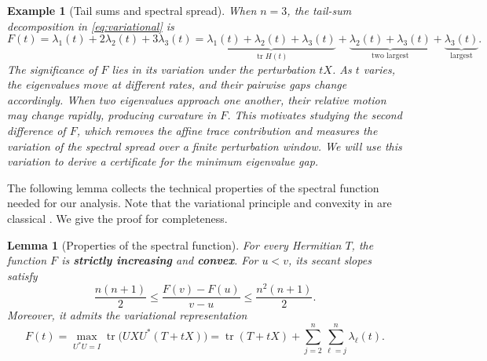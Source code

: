 \documentclass[10pt,a4paper]{article}
\newtheorem{lemma}{Lemma}[section]
\newtheorem{example}{Example}[section]
\DeclareMathOperator{\tr}{tr}
\begin{document}
\begin{example}[Tail sums and spectral spread]\label{ex:tails}
When $n=3$, the tail-sum decomposition in \eqref{eq:variational} is
\[
F(t)=\lambda_1(t)+2\lambda_2(t)+3\lambda_3(t)
=\underbrace{\lambda_1(t)+\lambda_2(t)+\lambda_3(t)}_{\tr H(t)}
+\underbrace{\lambda_2(t)+\lambda_3(t)}_{\text{two largest}}
+\underbrace{\lambda_3(t)}_{\text{largest}}.
\]
The significance of $F$ lies in its variation under the perturbation $tX$.
As $t$ varies, the eigenvalues move at different rates,
and their pairwise gaps change accordingly. When two
eigenvalues approach one another, their relative motion
may change rapidly, producing curvature in $F$.
This motivates studying the second difference of $F$,
which removes the affine trace contribution and measures
the variation of the spectral spread over a finite
perturbation window. We will use this variation to
derive a certificate for the minimum eigenvalue gap.
\end{example}

The following lemma collects the technical properties of the spectral function needed for our analysis. Note that the variational principle and convexity in  are classical
\cite{Fan1949,OvertonWomersley1992,Lewis1996Convex}. We give the proof for completeness. 

\begin{lemma}[Properties of the spectral function]\label{lem:convex}
For every Hermitian $T$, the function $F$ is
\textbf{strictly increasing} and \textbf{convex}.
For $u<v$, its secant slopes satisfy
\begin{equation}\label{eq:slopes}
\boxed{
\frac{n(n+1)}2
\leq\frac{F(v)-F(u)}{v-u}
\leq\frac{n^2(n+1)}2.
}
\end{equation}
Moreover, it admits the variational representation
\begin{equation}\label{eq:variational}
F(t)
=\max_{U^*U=I}\tr\bigl(UXU^*(T+tX)\bigr)
=\tr(T+tX)+\sum_{j=2}^n\sum_{\ell=j}^n\lambda_\ell(t).
\end{equation}
\end{lemma}
\end{document}

